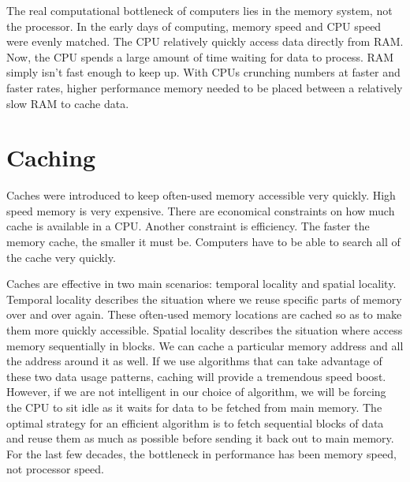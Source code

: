 
The real computational bottleneck of computers lies in the memory system, not the processor.  
In the early days of computing, memory speed and CPU speed were evenly matched.  
The CPU relatively quickly access data directly from RAM.  
Now, the CPU spends a large amount of time waiting for data to process.  
RAM simply isn't fast enough to keep up.  With CPUs crunching numbers at faster and faster rates, higher performance memory needed to be placed between a relatively slow RAM to cache data.  

\section*{Caching}
Caches were introduced to keep often-used memory accessible very quickly.  High speed memory is very expensive.
There are economical constraints on how much cache is available in a CPU.
Another constraint is efficiency.  The faster the memory cache, the smaller it must be.
Computers have to be able to search all of the cache very quickly.

Caches are effective in two main scenarios: temporal locality and spatial locality.
Temporal locality describes the situation where we reuse specific parts of memory over and over again.
These often-used memory locations are cached so as to make them more quickly accessible.
Spatial locality describes the situation where access memory sequentially in blocks.
We can cache a particular memory address and all the address around it as well.
If we use algorithms that can take advantage of these two data usage patterns, caching will provide a tremendous speed boost.
However, if we are not intelligent in our choice of algorithm, we will be forcing the CPU to sit idle as it waits for data to be fetched from main memory.
The optimal strategy for an efficient algorithm is to fetch sequential blocks of data and reuse them as much as possible before sending it back out to main memory.
For the last few decades, the bottleneck in performance has been memory speed, not processor speed.


